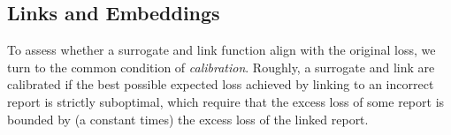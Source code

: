 \documentclass[12pt]{article}
\newcommand{\Comments}{1}
\newcommand{\mynote}[2]{\ifnum\Comments=1\textcolor{#1}{#2}\fi}
\newcommand{\raf}[1]{\mynote{darkgreen}{[RF: #1]}}
\newcommand{\reals}{\mathbb{R}}
\newcommand{\simplex}{\Delta_\Y}
\newcommand{\R}{\mathcal{R}}
\newcommand{\X}{\mathcal{X}}
\newcommand{\Y}{\mathcal{Y}}
\newcommand{\inprod}[2]{\langle #1, #2 \rangle}%
\newcommand{\toto}{\rightrightarrows}
\newtheorem{definition}{Definition}
\begin{document}

\subsection{Links and Embeddings}
\label{sec:links-embeddings}

To assess whether a surrogate and link function align with the original loss, we turn to the common condition of \emph{calibration}.
Roughly, a surrogate and link are calibrated if the best possible expected loss achieved by linking to an incorrect report is strictly suboptimal, which require that the excess loss of some report is bounded by (a constant times) the excess loss of the linked report.


\end{document}
